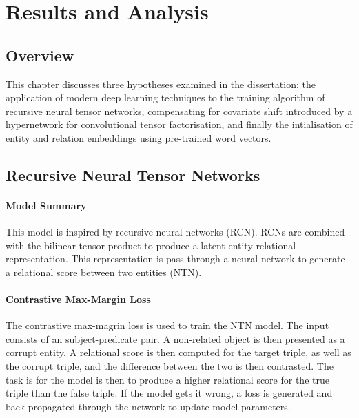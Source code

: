 

\chapter{Results and Analysis}  %

\ifpdf
     \graphicspath{{Figs/Chapter4/}}
\else
    \graphicspath{{Chapter4/Figs/Vector/}{Chapter4/Figs/}}
\fi

\section{Overview}
This chapter discusses three hypotheses examined in the dissertation: the application of modern deep learning techniques to the training algorithm of recursive neural tensor networks, compensating for covariate shift introduced by a hypernetwork for convolutional tensor factorisation, and finally the intialisation of entity and relation embeddings using pre-trained word vectors. \bigskip



\section{Recursive Neural Tensor Networks}

\subsubsection{Model Summary} 
This model is inspired by recursive neural networks (RCN). RCNs are combined with the bilinear tensor product to produce a latent entity-relational representation. This representation is pass through a neural network to generate a relational score between two entities (NTN). 

\subsubsection{Contrastive Max-Margin Loss}
The contrastive max-magrin loss is used to train the NTN model. The input consists of an subject-predicate pair. A non-related object is then presented as a corrupt entity. A relational score is then computed for the target triple, as well as the corrupt triple, and the difference between the two is then contrasted. The task is for the model is then to produce a higher relational score for the true triple than the false triple. If the model gets it wrong, a loss is generated and back propagated through the network to update model parameters. \newline

